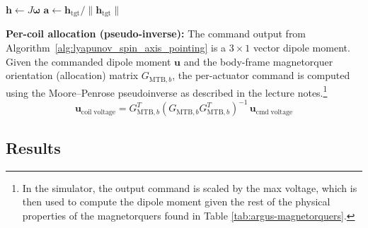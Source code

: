 \documentclass[conference,onecolumn,draftclsnofoot]{IEEEtran}
\begin{document}
\begin{algorithm}[H]
\caption{Fisch et al. Lyapunov-Based Spin-Axis Pointing Controller}
\label{alg:lyapunov_spin_axis_pointing}


$\mathbf{h} \leftarrow J\boldsymbol{\omega}$\;
$\mathbf{a} \leftarrow \mathbf{h}_{\mathrm{tgt}}/\|\mathbf{h}_{\mathrm{tgt}}\|$\;


\;
\label{alg:lyapunov_spin_axis_pointing}
\end{algorithm}

\noindent\textbf{Per-coil allocation (pseudo-inverse):} The command output from Algorithm~\ref{alg:lyapunov_spin_axis_pointing} is a $3 \times 1$ vector dipole moment. Given the commanded dipole moment $\boldsymbol{u}$ and the body-frame magnetorquer orientation (allocation) matrix $G_{\mathrm{MTB},b}$, the per-actuator command is computed using the Moore--Penrose pseudoinverse as described in the lecture notes.\footnote{In the simulator, the output command is scaled by the max voltage, which is then used to compute the dipole moment given the rest of the physical properties of the magnetorquers found in Table \ref{tab:argus-magnetorquers}.}
\begin{equation}
\mathbf{u}_{\mathrm{coil\;voltage}} = G_{\mathrm{MTB},b}^T(G_{\mathrm{MTB},b}G_{\mathrm{MTB},b}^T)^{-1}\,\boldsymbol{\mathbf{u}}_{\mathrm{cmd\;voltage}}
\end{equation}

\subsection{Results}
\end{document}
